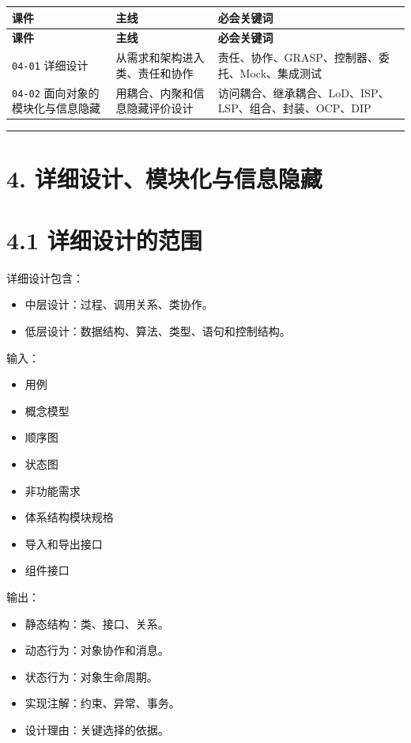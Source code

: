 \documentclass[UTF8,zihao=-4]{ctexart}
\begin{document}
{
\footnotesize
\begin{longtable}{|>{\raggedright\arraybackslash}p{}|>{\raggedright\arraybackslash}p{}|>{\raggedright\arraybackslash}p{}|}
\hline
\textbf{课件} & \textbf{主线} & \textbf{必会关键词} \\
\hline
\endfirsthead
\hline
\textbf{课件} & \textbf{主线} & \textbf{必会关键词} \\
\hline
\endhead
\texttt{04-01} 详细设计 & 从需求和架构进入类、责任和协作 & 责任、协作、GRASP、控制器、委托、Mock、集成测试 \\
\hline
\texttt{04-02} 面向对象的模块化与信息隐藏 & 用耦合、内聚和信息隐藏评价设计 & 访问耦合、继承耦合、LoD、ISP、LSP、组合、封装、OCP、DIP \\
\hline
\end{longtable}
}


\bigskip\hrule\bigskip

\section{4. 详细设计、模块化与信息隐藏}

\section{4.1 详细设计的范围}

详细设计包含：

\begin{itemize}
\item 中层设计：过程、调用关系、类协作。
\item 低层设计：数据结构、算法、类型、语句和控制结构。
\end{itemize}

输入：

\begin{itemize}
\item 用例
\item 概念模型
\item 顺序图
\item 状态图
\item 非功能需求
\item 体系结构模块规格
\item 导入和导出接口
\item 组件接口
\end{itemize}

输出：

\begin{itemize}
\item 静态结构：类、接口、关系。
\item 动态行为：对象协作和消息。
\item 状态行为：对象生命周期。
\item 实现注解：约束、异常、事务。
\item 设计理由：关键选择的依据。
\end{itemize}
\end{document}
